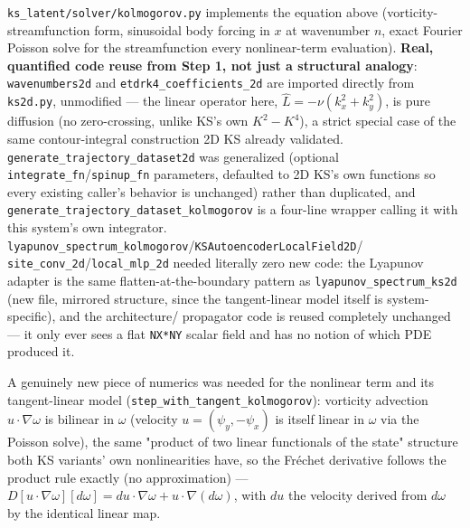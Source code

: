 \documentclass[11pt]{article}
\begin{document}
\texttt{ks\_latent/solver/kolmogorov.py} implements the equation above
(vorticity-streamfunction form, sinusoidal body forcing in $x$ at
wavenumber $n$, exact Fourier Poisson solve for the streamfunction every
nonlinear-term evaluation). \textbf{Real, quantified code reuse from
Step 1, not just a structural analogy}: \texttt{wavenumbers2d} and
\texttt{etdrk4\_coefficients\_2d} are imported directly from
\texttt{ks2d.py}, unmodified --- the linear operator here,
$\hat L=-\nu(k_x^2+k_y^2)$, is pure diffusion (no zero-crossing, unlike
KS's own $K^2-K^4$), a strict special case of the same contour-integral
construction 2D KS already validated. \texttt{generate\_trajectory\_dataset2d}
was generalized (optional \texttt{integrate\_fn}/\texttt{spinup\_fn}
parameters, defaulted to 2D KS's own functions so every existing caller's
behavior is unchanged) rather than duplicated, and
\texttt{generate\_trajectory\_dataset\_kolmogorov} is a four-line wrapper
calling it with this system's own integrator.
\texttt{lyapunov\_spectrum\_kolmogorov}/\texttt{KSAutoencoderLocalField2D}/
\texttt{site\_conv\_2d}/\texttt{local\_mlp\_2d} needed literally zero new
code: the Lyapunov adapter is the same flatten-at-the-boundary pattern as
\texttt{lyapunov\_spectrum\_ks2d} (new file, mirrored structure, since the
tangent-linear model itself is system-specific), and the architecture/
propagator code is reused completely unchanged --- it only ever sees a
flat \texttt{NX*NY} scalar field and has no notion of which PDE produced
it.

A genuinely new piece of numerics was needed for the nonlinear term and
its tangent-linear model (\texttt{step\_with\_tangent\_kolmogorov}):
vorticity advection $u\cdot\nabla\omega$ is bilinear in $\omega$ (velocity
$u=(\psi_y,-\psi_x)$ is itself linear in $\omega$ via the Poisson solve),
the same "product of two linear functionals of the state" structure both
KS variants' own nonlinearities have, so the Fr\'echet derivative follows
the product rule exactly (no approximation) --- $D[u\cdot\nabla\omega][d\omega]
= du\cdot\nabla\omega + u\cdot\nabla(d\omega)$, with $du$ the velocity
derived from $d\omega$ by the identical linear map.
\end{document}
